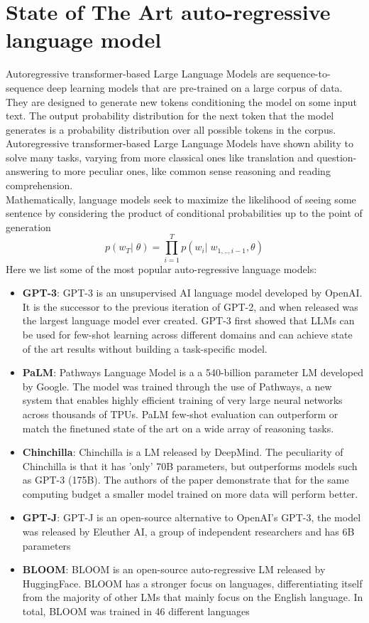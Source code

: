 \section{State of The Art auto-regressive language model}
Autoregressive transformer-based Large Language Models are sequence-to-sequence deep learning models that are pre-trained on a large corpus of data. They are designed to generate new tokens conditioning the model on some input text. The output probability distribution for the next token that the model generates is a probability distribution over all possible tokens in the corpus. \\
Autoregressive transformer-based Large Language Models have shown ability to solve many tasks\cite{gpt3}, varying from more classical ones like translation and question-answering to more peculiar ones, like common sense reasoning and reading comprehension. \\
Mathematically, language models seek to maximize the likelihood of seeing some sentence by considering the product of conditional probabilities up to the point of generation
\begin{equation}
    p(w_T|\;\theta) = \prod_{i=1}^{T}p(w_i|\;w_{1,..,i-1}, \theta)
\end{equation}
Here we list some of the most popular auto-regressive language models:
\begin{itemize}
    \item \textbf{GPT-3}: GPT-3\cite{brown2020language} is an unsupervised AI language model developed by OpenAI. It is the successor to the previous iteration of GPT-2, and when released was the largest language model ever created. GPT-3 first showed that LLMs can be used for few-shot learning across different domains and can achieve state of the art results without building a task-specific model.
    \item \textbf{PaLM}: Pathways Language Model\cite{chowdhery2022palm} is a a 540-billion parameter LM developed by Google. The model was trained through the use of Pathways, a new system that enables highly efficient training of very large neural networks across thousands of TPUs. PaLM few-shot evaluation can outperform or match the finetuned state of the art on a wide array of reasoning tasks.
    \item \textbf{Chinchilla}: Chinchilla\cite{hoffmann2022training} is a LM released by DeepMind. The peculiarity of Chinchilla is that it has 'only' 70B parameters, but outperforms models such as GPT-3 (175B). The authors of the paper demonstrate that for the same computing budget a smaller model trained on more data will perform better.
    \item \textbf{GPT-J}: GPT-J\cite{gptj} is an open-source alternative to OpenAI's GPT-3, the model was released by Eleuther AI, a group of independent researchers and has 6B parameters
    \item \textbf{BLOOM}: BLOOM\cite{scao2022bloom} is an open-source auto-regressive LM released by HuggingFace. BLOOM has a stronger focus on languages, differentiating itself from the majority of other LMs that mainly focus on the English language. In total, BLOOM was trained in 46 different languages
\end{itemize}
